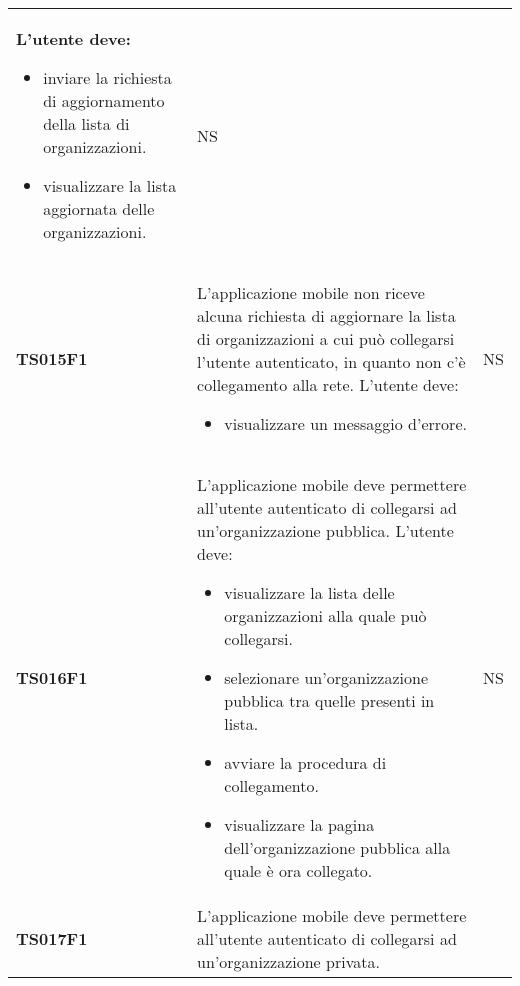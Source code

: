 \documentclass[../piano-di-qualifica.tex]{subfiles}
\begin{document}
\begin{longtable}[H]{>{\centering\bfseries}m{3cm} >{}m{10cm} >{\centering\arraybackslash}m{3cm}}
  L'utente deve:
  \begin{itemize}
    \item inviare la richiesta di aggiornamento della lista di organizzazioni.
    \item visualizzare la lista aggiornata delle organizzazioni.
  \end{itemize}
                     & NS                                                                                                                                                                                                                                                               \\
  TS015F1            & L'applicazione mobile non riceve alcuna richiesta di aggiornare la lista di organizzazioni a cui può collegarsi l'utente autenticato, in quanto non c'è collegamento alla rete. \newline
  L'utente deve:
  \begin{itemize}
    \item visualizzare un messaggio d'errore.
  \end{itemize}
                     & NS                                                                                                                                                                                                                                                               \\
  TS016F1            & L'applicazione mobile deve permettere all'utente autenticato di collegarsi ad un'organizzazione pubblica. \newline
  L'utente deve:
  \begin{itemize}
    \item visualizzare la lista delle organizzazioni alla quale può collegarsi.
    \item selezionare un'organizzazione pubblica tra quelle presenti in lista.
    \item avviare la procedura di collegamento.
    \item visualizzare la pagina dell'organizzazione pubblica alla quale è ora collegato.
  \end{itemize}
                     & NS                                                                                                                                                                                                                                                               \\
  TS017F1            & L'applicazione mobile deve permettere all'utente autenticato di collegarsi ad un'organizzazione privata. \newline

\end{longtable}
\end{document}
